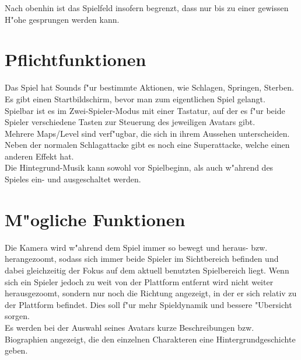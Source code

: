 \documentclass[a4paper, 11pt]{article}
\begin{document}
    \noindent
    Nach obenhin ist das Spielfeld insofern begrenzt, dass nur bis zu einer gewissen H"ohe gesprungen werden kann.

    \section{Pflichtfunktionen}\label{sec:muss}
    Das Spiel hat Sounds f"ur bestimmte Aktionen, wie Schlagen, Springen, Sterben.\\

    \noindent
    Es gibt einen Startbildschirm, bevor man zum eigentlichen Spiel gelangt.\\

    \noindent
    Spielbar ist es im Zwei-Spieler-Modus mit einer Tastatur, auf der es f"ur beide Spieler verschiedene
    Tasten zur Steuerung des jeweiligen Avatars gibt.\\

    \noindent
    Mehrere Maps/Level sind verf"ugbar, die sich in ihrem Aussehen unterscheiden.\\

    \noindent
    Neben der normalen Schlagattacke gibt es noch eine Superattacke, welche einen anderen Effekt hat.\\

    \noindent
    Die Hintegrund-Musik kann sowohl vor Spielbeginn, als auch w"ahrend des Spieles ein- und ausgeschaltet werden.

    \section{M"ogliche Funktionen}\label{sec:kann}

    Die Kamera wird w"ahrend dem Spiel immer so bewegt und heraus- bzw. herangezoomt, sodass sich immer beide
    Spieler im Sichtbereich befinden und dabei gleichzeitig der Fokus auf dem aktuell benutzten Spielbereich liegt.
    Wenn sich ein Spieler jedoch zu weit von der Plattform entfernt wird nicht weiter herausgezoomt, sondern nur noch die
    Richtung angezeigt, in der er sich relativ zu der Plattform befindet.
    Dies soll f"ur mehr Spieldynamik und bessere "Ubersicht sorgen.\\

    \noindent
    Es werden bei der Auswahl seines Avatars kurze Beschreibungen bzw. Biographien angezeigt, die den einzelnen Charakteren
    eine Hintergrundgeschichte geben.\\
\end{document}
